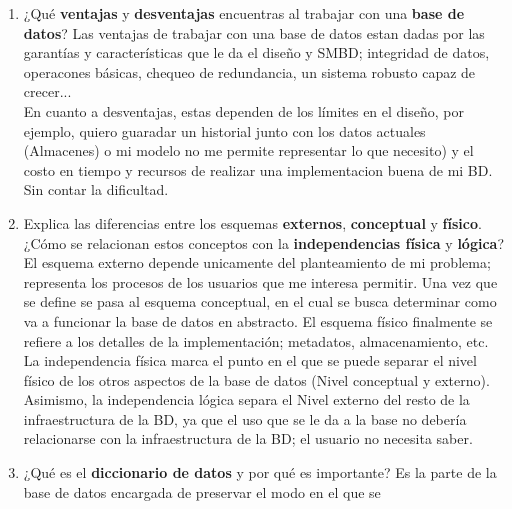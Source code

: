 \documentclass{article}
\begin{document}
\begin{enumerate}[label=\alph*.]
{                gráficas a partir de ellas y realizar unos calculos (promedios, sumas de
                secciones, etc.) Excel o alguna herramienta similar sería una buena opción.
            }
        \item {
            ¿Qué \textbf{ventajas}  y \textbf{desventajas} encuentras al 
            trabajar con una \textbf{base de datos}?
        }
            {
                Las ventajas de trabajar con una base de datos estan dadas por las garantías
                y características que le da el diseño y SMBD; integridad de datos, operacones 
                básicas, chequeo de redundancia, un sistema robusto capaz de crecer...\\
                En cuanto a desventajas, estas dependen de los límites en el diseño, por 
                ejemplo,  quiero guaradar un historial junto con los datos actuales (Almacenes) 
                o mi modelo no me permite representar lo que necesito) y el costo en tiempo y
                recursos de realizar una implementacion buena de mi BD. Sin contar la dificultad.
            }
        \item {
            Explica las diferencias entre los esquemas \textbf{externos}, 
            \textbf{conceptual} y \textbf{físico}. ¿Cómo se relacionan estos 
            conceptos con la \textbf{independencias física} y \textbf{lógica}? 
        }
            {
                El esquema externo depende unicamente del planteamiento de mi problema;
                representa los procesos de los usuarios que me interesa permitir.
                Una vez que se define se pasa al esquema conceptual, en el cual se busca 
                determinar como va a funcionar la base de datos en abstracto.
                El esquema físico finalmente se refiere a los detalles de la implementación; 
                metadatos, almacenamiento, etc.
                La independencia física marca el punto en el que se puede separar el nivel 
                físico de los otros aspectos de la base de datos (Nivel conceptual y externo).
                Asimismo, la independencia lógica separa el Nivel externo del resto de la
                infraestructura de la BD, ya que el uso que se le da a la base no debería
                relacionarse con la infraestructura de la BD; el usuario no  necesita saber.
            }
        \item {
            ¿Qué es el \textbf{diccionario de datos} y por qué es importante?
        }
            {
                Es la parte de la base de datos encargada de preservar el modo en el que se
}
\end{enumerate}
\end{document}
